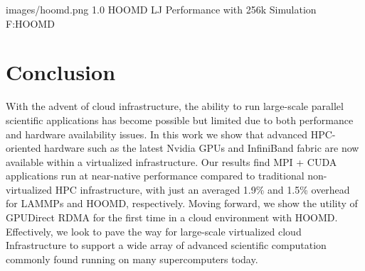 \documentclass[times,10pt,twocolumn,conference]{IEEEtran}
\begin{document}
  {images/hoomd.png}
  {1.0}
  {HOOMD LJ Performance with 256k Simulation}
  {F:HOOMD}

\section{Conclusion}

With the advent of cloud infrastructure, the ability to run large-scale parallel scientific applications has become possible but limited due to both performance and hardware availability issues. In this work we show that advanced HPC-oriented hardware such as the latest Nvidia GPUs and InfiniBand fabric are now available within a virtualized infrastructure. Our results find MPI + CUDA applications run at near-native performance compared to traditional non-virtualized HPC infrastructure, with just an averaged 1.9\% and 1.5\% overhead for LAMMPs and HOOMD, respectively. Moving forward, we show the utility of GPUDirect RDMA for the first time in a cloud environment with HOOMD.  Effectively, we look to pave the way for large-scale virtualized cloud Infrastructure to support a wide array of advanced scientific computation commonly found running on many supercomputers today.  %










\end{document}
